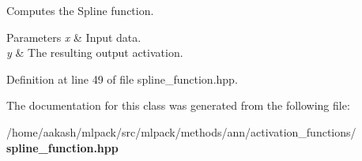 Computes the Spline function. 


\begin{DoxyParams}{Parameters}
{\em x} & Input data. \\
\hline
{\em y} & The resulting output activation. \\
\hline
\end{DoxyParams}


Definition at line 49 of file spline\+\_\+function.\+hpp.



The documentation for this class was generated from the following file\+:\begin{DoxyCompactItemize}
\item 
/home/aakash/mlpack/src/mlpack/methods/ann/activation\+\_\+functions/\textbf{ spline\+\_\+function.\+hpp}\end{DoxyCompactItemize}
